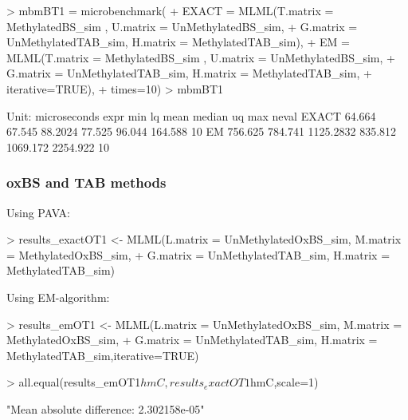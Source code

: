 \documentclass{article}
\begin{document}
\begin{Schunk}
\begin{Sinput}
>  mbmBT1 = microbenchmark(
+     EXACT = MLML(T.matrix = MethylatedBS_sim , U.matrix = UnMethylatedBS_sim,
+                  G.matrix = UnMethylatedTAB_sim, H.matrix = MethylatedTAB_sim),
+     EM =    MLML(T.matrix = MethylatedBS_sim , U.matrix = UnMethylatedBS_sim,
+                  G.matrix = UnMethylatedTAB_sim, H.matrix = MethylatedTAB_sim,
+                  iterative=TRUE),
+     times=10)
>  mbmBT1
\end{Sinput}
\begin{Soutput}
Unit: microseconds
  expr     min      lq      mean  median       uq      max neval
 EXACT  64.664  67.545   88.2024  77.525   96.044  164.588    10
    EM 756.625 784.741 1125.2832 835.812 1069.172 2254.922    10
\end{Soutput}
\end{Schunk}


\subsubsection{oxBS and TAB methods}

 Using PAVA:
\begin{Schunk}
\begin{Sinput}
>  results_exactOT1 <- MLML(L.matrix = UnMethylatedOxBS_sim, M.matrix = MethylatedOxBS_sim,
+  G.matrix = UnMethylatedTAB_sim, H.matrix = MethylatedTAB_sim)
\end{Sinput}
\end{Schunk}

 Using EM-algorithm:
\begin{Schunk}
\begin{Sinput}
>  results_emOT1 <- MLML(L.matrix = UnMethylatedOxBS_sim, M.matrix = MethylatedOxBS_sim,
+  G.matrix = UnMethylatedTAB_sim, H.matrix = MethylatedTAB_sim,iterative=TRUE)
\end{Sinput}
\end{Schunk}


\begin{Schunk}
\begin{Sinput}
>  all.equal(results_emOT1$hmC,results_exactOT1$hmC,scale=1)
\end{Sinput}
\begin{Soutput}
[1] "Mean absolute difference: 2.302158e-05"
\end{Soutput}
\end{Schunk}
\end{document}
